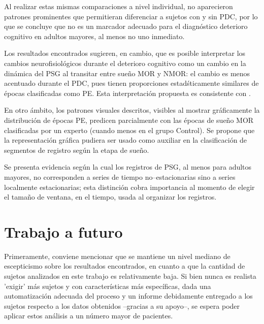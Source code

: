 \documentclass[12pt,a4paper]{mitthesis}
\begin{document}
Al realizar estas mismas comparaciones a nivel individual, no aparecieron patrones prominentes que 
permitieran diferenciar a sujetos con y sin PDC, por lo que se concluye que no es un marcador 
adecuado para el diagn\'ostico deterioro cognitivo en adultos mayores, al menos no uno inmediato.

Los resultados encontrados sugieren, en cambio, que es posible interpretar los cambios 
neurofisiol\'ogicos durante el deterioro cognitivo como un cambio en la din\'amica del PSG al 
transitar entre sue\~no MOR y NMOR: el cambio es menos acentuado durante el PDC, pues tienen 
proporciones estad\'sticamente similares de \'epocas clasificadas como PE.
Esta interpretaci\'on propuesta es consistente con \cite{Valeria}.

En otro \'ambito, los patrones visuales descritos, visibles al mostrar gr\'aficamente la 
distribuci\'on de \'epocas PE, predicen parcialmente con las \'epocas de sue\~no MOR clasificadas 
por un experto (cuando menos en el grupo Control).
Se propone que la representaci\'on gr\'afica pudiera ser usado como auxiliar en la clasificaci\'on 
de segmentos de registro seg\'un la etapa de sue\~no.

Se presenta evidencia seg\'un la cual los registros de PSG, al menos para adultos mayores, no 
corresponden a series de tiempo no--estacionarias sino a series localmente estacionarias; esta 
distinci\'on cobra importancia al momento de elegir el tama\~no de ventana, en el tiempo, usada al 
organizar los registros.


\section{Trabajo a futuro}

Primeramente, conviene mencionar que se mantiene un nivel mediano de escepticismo sobre los 
resultados encontrados, en cuanto a que la cantidad de sujetos analizados en este trabajo es 
relativamente baja. Si bien nunca es realista 'exigir' m\'as sujetos y con caracter\'isticas m\'as 
espec\'ificas, dada una automatizaci\'on adecuada del proceso y un informe debidamente entregado a 
los sujetos respecto a los datos obtenidos --gracias a su apoyo--, se espera poder aplicar estos 
an\'alisis a un n\'umero mayor de pacientes.
\end{document}
